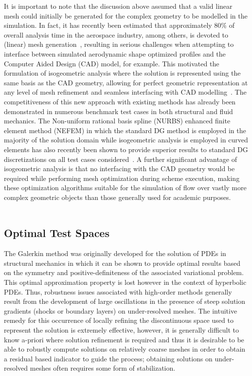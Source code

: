 \documentclass[12pt,Bold,letterpaper,TexShade]{mcgilletdclass}
\numberwithin{equation}{section}
\begin{document}
It is important to note that the discussion above assumed that a valid linear mesh could initially be generated for the complex geometry to be modelled in the simulation. In fact, it has recently been estimated that approximately 80\% of overall analysis time in the aerospace industry, among others, is devoted to (linear) mesh generation~\cite{hughes2005}, resulting in serious challenges when attempting to interface between simulated aerodynamic shape optimized profiles and the Computer Aided Design (CAD) model, for example. This motivated the formulation of isogeometric analysis where the solution is represented using the same basis as the CAD geometry, allowing for perfect geometric representation at any level of mesh refinement and seamless interfacing with CAD modelling~\cite{hughes2005}. The competitiveness of this new approach with existing methods has already been demonstrated in numerous benchmark test cases in both structural and fluid mechanics. The Non-uniform rational basis spline (NURBS) enhanced finite element method (NEFEM) in which the standard DG method is employed in the majority of the solution domain while isogeometric analysis is employed in curved elements has also recently been shown to provide superior results to standard DG discretizations on all test cases considered~\cite{sevilla2008,sevilla2011}. A further significant advantage of isogeometric analysis is that no interfacing with the CAD geometry would be required while performing mesh optimization during scheme execution, making these optimization algorithms suitable for the simulation of flow over vastly more complex geometric objects than those generally used for academic purposes.
\\~

\subsection{Optimal Test Spaces}

The Galerkin method was originally developed for the solution of PDEs in structural mechanics in which it can be shown to provide optimal results based on the symmetry and positive-definiteness of the associated variational problem. This optimal approximation property is lost however in the context of hyperbolic PDEs. Thus, robustness issues associated with high-order methods generally result from the development of large oscillations in the presence of steep solution gradients (shocks or boundary layers) on under-resolved meshes. The intuitive remedy for this occurrence of locally refining the discontinuous space used to represent the solution is extremely effective, however, it is generally difficult to know a-priori where solution refinement is required and thus it is desirable to be able to robustly compute solutions on relatively coarse meshes in order to obtain a residual based indicator to guide the process; obtaining solutions on under-resolved meshes often requires some form of stabilization.
\\~
\end{document}
